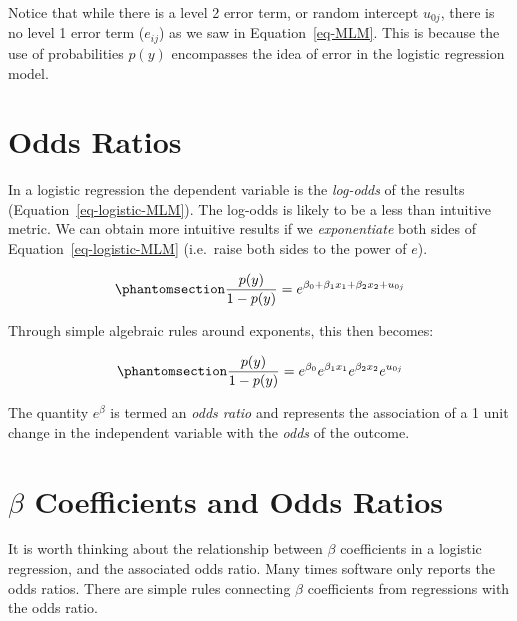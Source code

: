 \documentclass[
  letterpaper,
  DIV=11,
  numbers=noendperiod]{scrreprt}
\begin{document}
Notice that while there is a level 2 error term, or random intercept
\(u_{0j}\), there is no level 1 error term (\(e_{ij}\)) as we saw in
Equation~\ref{eq-MLM}. This is because the use of probabilities \(p(y)\)
encompasses the idea of error in the logistic regression model.

\section{Odds Ratios}\label{odds-ratios}

In a logistic regression the dependent variable is the \emph{log-odds}
of the results (Equation~\ref{eq-logistic-MLM}). The log-odds is likely
to be a less than intuitive metric. We can obtain more intuitive results
if we \emph{exponentiate} both sides of Equation~\ref{eq-logistic-MLM}
(i.e.~raise both sides to the power of \(e\)).

\begin{equation}\phantomsection\label{eq-logistic-MLM-exponentiated}{\frac{p(y)}{1-p(y)} = e^{\beta_0 + \beta_1 x_1 + \beta_2 x_2 + u_{0j}}}\end{equation}

Through simple algebraic rules around exponents, this then becomes:

\begin{equation}\phantomsection\label{eq-logistic-MLM-exponentiated-multiplied}{\frac{p(y)}{1-p(y)}= e^{\beta_0} e^{\beta_1 x_1} e^{\beta_2 x_2} e^{u_{0j}}}\end{equation}

The quantity \(e^{\beta}\) is termed an \emph{odds ratio} and represents
the association of a 1 unit change in the independent variable with the
\emph{odds} of the outcome.

\section{\texorpdfstring{\(\beta\) Coefficients and Odds
Ratios}{\textbackslash beta Coefficients and Odds Ratios}}\label{beta-coefficients-and-odds-ratios}

It is worth thinking about the relationship between \(\beta\)
coefficients in a logistic regression, and the associated odds ratio.
Many times software only reports the odds ratios. There are simple rules
connecting \(\beta\) coefficients from regressions with the odds ratio.
\end{document}
